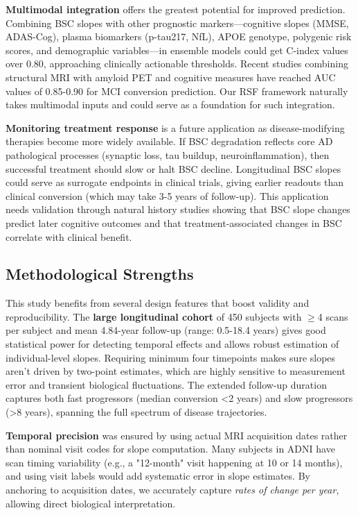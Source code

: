 \documentclass[blue]{ludusofficial}  %
\begin{document}
\textbf{Multimodal integration} offers the greatest potential for improved prediction. Combining BSC slopes with other prognostic markers—cognitive slopes (MMSE, ADAS-Cog), plasma biomarkers (p-tau217, NfL), APOE genotype, polygenic risk scores, and demographic variables—in ensemble models could get C-index values over 0.80, approaching clinically actionable thresholds. Recent studies combining structural MRI with amyloid PET and cognitive measures have reached AUC values of 0.85-0.90 for MCI conversion prediction. Our RSF framework naturally takes multimodal inputs and could serve as a foundation for such integration.

\textbf{Monitoring treatment response} is a future application as disease-modifying therapies become more widely available. If BSC degradation reflects core AD pathological processes (synaptic loss, tau buildup, neuroinflammation), then successful treatment should slow or halt BSC decline. Longitudinal BSC slopes could serve as surrogate endpoints in clinical trials, giving earlier readouts than clinical conversion (which may take 3-5 years of follow-up). This application needs validation through natural history studies showing that BSC slope changes predict later cognitive outcomes and that treatment-associated changes in BSC correlate with clinical benefit.

\subsection{Methodological Strengths}

This study benefits from several design features that boost validity and reproducibility. The \textbf{large longitudinal cohort} of 450 subjects with $\geq$4 scans per subject and mean 4.84-year follow-up (range: 0.5-18.4 years) gives good statistical power for detecting temporal effects and allows robust estimation of individual-level slopes. Requiring minimum four timepoints makes sure slopes aren't driven by two-point estimates, which are highly sensitive to measurement error and transient biological fluctuations. The extended follow-up duration captures both fast progressors (median conversion <2 years) and slow progressors (>8 years), spanning the full spectrum of disease trajectories.

\textbf{Temporal precision} was ensured by using actual MRI acquisition dates rather than nominal visit codes for slope computation. Many subjects in ADNI have scan timing variability (e.g., a "12-month" visit happening at 10 or 14 months), and using visit labels would add systematic error in slope estimates. By anchoring to acquisition dates, we accurately capture \textit{rates of change per year}, allowing direct biological interpretation.
\end{document}
